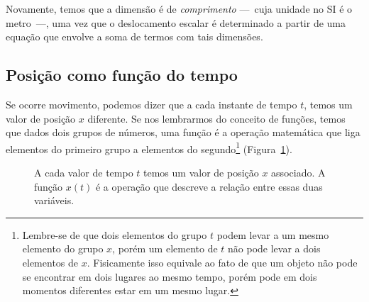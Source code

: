 Novamente, temos que a dimensão é de \emph{comprimento} ---~cuja unidade no SI é o metro~---, uma vez que o deslocamento escalar é determinado a partir de uma equação que envolve a soma de termos com tais dimensões.


\subsection{Posição como função do tempo}

Se ocorre movimento, podemos dizer que a cada instante de tempo $t$, temos um valor de posição $x$ diferente. Se nos lembrarmos do conceito de funções, temos que dados dois grupos de números, uma função é a operação matemática que liga elementos do primeiro grupo a elementos do segundo\footnote[][-4cm]{Lembre-se de que dois elementos do grupo $t$ podem levar a um mesmo elemento do grupo $x$, porém um elemento de $t$ não pode levar a dois elementos de $x$. Fisicamente isso equivale ao fato de que um objeto não pode se encontrar em dois lugares ao mesmo tempo, porém pode em dois momentos diferentes estar em um mesmo lugar.} (Figura~\ref{Fig:DefFuncaoPosicaoDoTempo}).
\begin{figure}\forcerectofloat
\centering
{}
\caption{A cada valor de tempo $t$ temos um valor de posição $x$ associado. A função $x(t)$ é a operação que descreve a relação entre essas duas variáveis.\label{Fig:DefFuncaoPosicaoDoTempo}}
\end{figure}

